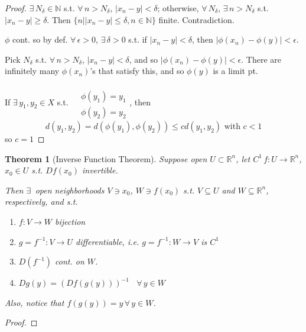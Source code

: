 \documentclass[10pt]{amsart}
\newtheorem{theorem}{Theorem}
\begin{document}
\begin{multicols*}{2}
\begin{proof}
$\exists \, N_{\delta} \in \mathbb{N}$ s.t. $\forall \, n > N_{\delta}$, $|x_n-y|< \delta$; otherwise, $\forall \, N_{\delta}$, $\exists \, n > N_{\delta}$ s.t. $|x_n - y| \geq \delta$.  Then $\lbrace n | |x_n -y| \leq \delta , n \in \mathbb{N} \rbrace$ finite.  Contradiction.  

$\phi$ cont. so by def. $\forall \, \epsilon >0$, $\exists \, \delta >0$ s.t. if $|x_n -y| < \delta$, then $|\phi(x_n) - \phi(y) | < \epsilon$.  

Pick $N_{\delta}$ s.t. $\forall \, n > N_{\delta}$, $|x_n-y| < \delta$, and so $|\phi(x_n) - \phi(y)|< \epsilon$. There are infinitely many $\phi(x_n)$'s that satisfy this, and so $\phi(y)$ is a limit pt.  

If $\exists \, y_1,y_2 \in X$ s.t. $\begin{aligned} & \quad \\
  & \phi(y_1) = y_1 \\ 
  & \phi(y_2) = y_2 \end{aligned}$, then
\[
d(y_1,y_2) = d(\phi(y_1), \phi(y_2)) \leq c d(y_1,y_2) \text{ with } c <1
\]
so $c=1$
\end{proof}


\begin{theorem}[Inverse Function Theorem]
  Suppose open $U \subset \mathbb{R}^n$, let $C^1 \, f: U \to \mathbb{R}^n$, $x_0 \in U$ s.t. $Df(x_0)$ invertible.  


Then $\exists \,$ open neighborhoods $V\ni x_0$, $W \ni f(x_0)$ s.t. $V\subseteq U$ and $W\subseteq \mathbb{R}^n$, respectively, and s.t.

\begin{enumerate}
\item[(i)] $f: V\to W$ bijection
\item[(ii)] $g = f^{-1}:V \to U$ differentiable, i.e. $g = f^{-1}:W\to V$ is $C^1$
\item[(iii)] $D(f^{-1}) $ cont. on $W$.  
\item[(iv)] $Dg(y) = (Df(g(y)))^{-1}$ \, $\forall \, y \in W$
\end{enumerate}
Also, notice that $f(g(y)) = y \, \forall \, y \in W$.  
\end{theorem}

\begin{proof}


\end{proof}
\end{multicols*}
\end{document}
